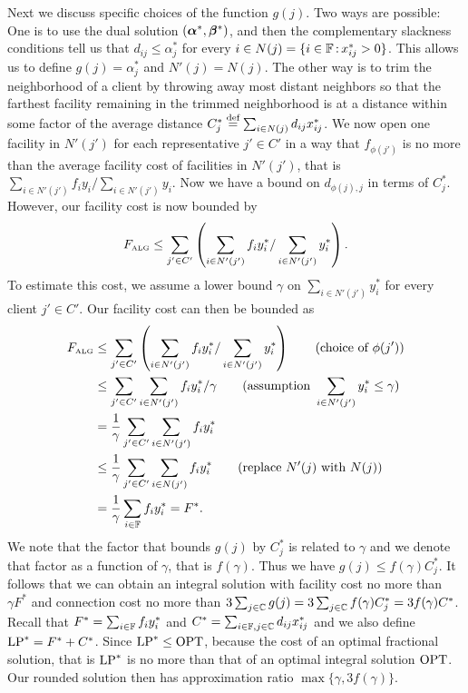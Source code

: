 \documentclass[oneside,final]{ucr}
\begin{document}
Next we discuss specific choices of the function $g(j)$. Two
ways are possible: One is to use the dual solution
$(\boldsymbol{\alpha}^\ast, \boldsymbol{\beta}^\ast)$, and then the complementary
slackness conditions tell us that $d_{ij} \leq
\alpha_j^\ast$ for every $i \in N(j) = \{i\in\mathbb{F}
{\,:\,} x_{ij}^\ast > 0\}$. This allows us to define $g(j)
= \alpha_j^\ast$ and $N'(j) = N(j)$. The other way is to
trim the neighborhood of a client by throwing away most
distant neighbors so that the farthest facility remaining in
the trimmed neighborhood is at a distance within some factor
of the average distance $C_j^\ast \stackrel{\text{def}}{=} \sum_{i\in N(j)}
d_{ij} x_{ij}^\ast$. We now open one facility in $N'(j')$
for each representative $j' \in C'$ in a way that
$f_{\phi(j')}$ is no more than the average facility cost of
facilities in $N'(j')$, that is $\sum_{i\in N'(j')} f_i y_i
/ \sum_{i \in N'(j')} y_i$. Now we have a bound on
$d_{\phi(j),j}$ in terms of $C_j^\ast$. However, our
facility cost is now bounded by
\begin{equation*}
  F_{\mbox{\tiny\rm ALG}} \leq \sum_{j'\in C'} \left(\sum_{i\in N'(j')} f_i y_i^\ast /
    \sum_{i\in N'(j')} y_i^\ast\right).
\end{equation*}
To estimate this cost, we assume a lower bound $\gamma$ on
$\sum_{i\in N'(j')} y_i^\ast$ for every client $j' \in C'$.
Our facility cost can then be bounded as
\begin{align*}
  F_{\mbox{\tiny\rm ALG}} &\leq \sum_{j'\in C'} \left(\sum_{i\in
      N'(j')} f_i y_i^\ast /
    \sum_{i\in N'(j')} y_i^\ast\right) \qquad (\text{choice
    of } \phi(j'))\\
  &\leq \sum_{j'\in C'}
  \sum_{i \in N'(j')} f_i y_i^\ast /\gamma \qquad
  (\text{assumption } \sum_{i\in N'(j')} y_i^\ast \leq \gamma)\\
  &= \frac{1}{\gamma} \sum_{j' \in C'} \sum_{i \in N'(j')}
  f_i y_i^\ast\\
  &\leq \frac{1}{\gamma} \sum_{j' \in C'} \sum_{i \in N(j')}
  f_i y_i^\ast \qquad (\text{replace } N'(j) \text{ with } N(j))\\
  &=
  \frac{1}{\gamma} \sum_{i \in \mathbb{F}} f_i y_i^\ast = F^\ast.\\
\end{align*}
We note that the factor that bounds $g(j)$ by $C_j^\ast$ is
related to $\gamma$ and we denote that factor as a function
of $\gamma$, that is $f(\gamma)$. Thus we have $g(j) \leq
f(\gamma) C_j^\ast$. It follows that we can obtain an
integral solution with facility cost no more than $\gamma
F^\ast$ and connection cost no more than $3 \sum_{j\in
  \mathbb{C}} g(j) = 3 \sum_{j\in \mathbb{C}} f(\gamma)
C_j^\ast = 3 f(\gamma) C^\ast$. Recall that $F^\ast =
\sum_{i\in \mathbb{F}} f_i y_i^\ast$ and $C^\ast =
\sum_{i\in\mathbb{F}, j\in\mathbb{C}} d_{ij} x_{ij}^\ast$ and
we also define $\mbox{\rm LP}^\ast = F^\ast + C^\ast$. Since $\mbox{\rm LP}^\ast
\leq \mbox{\rm OPT}$, because the cost of an optimal fractional
solution, that is $\mbox{\rm LP}^\ast$ is no more than that of an
optimal integral solution $\mbox{\rm OPT}$. Our rounded solution then
has approximation ratio $\max\{\gamma, 3 f(\gamma)\}$.
\end{document}
